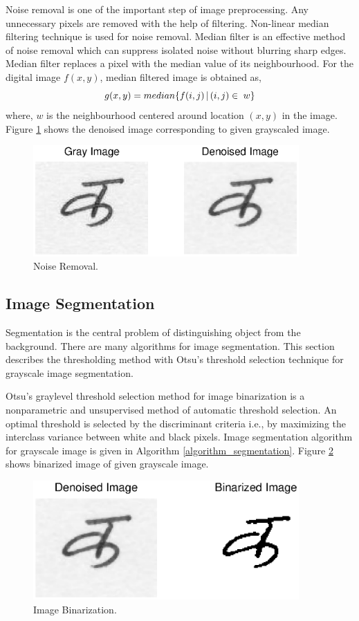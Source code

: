 Noise removal is one of the important step of image preprocessing. Any unnecessary pixels are removed with the help of filtering. Non-linear median filtering technique is used for noise removal. Median filter is an effective method of noise removal which can suppress isolated noise without blurring sharp edges. Median filter replaces a pixel with the median value of its neighbourhood. For the digital image $f(x,y)$, median filtered image is obtained as,
\begin{equation}
g(x,y)= median\{f(i,j)\;\vline \;(i,j)\in \; w \}
\end{equation}
where, $w$ is the neighbourhood centered around location $(x,y)$ in the image.
Figure \ref{figure_denoised} shows the denoised image corresponding to given grayscaled image.
\begin{figure}[hbtp]
\centering
\includegraphics[width=4in]{figures/ka_preprocessing/denoised.eps}
\caption{Noise Removal.}
\label{figure_denoised}
\end{figure}
\subsection{Image Segmentation}\label{section_image_segmentation}

Segmentation is the central problem of distinguishing object from the background. There are many algorithms for image segmentation. This section describes the thresholding method with Otsu's threshold selection technique \cite{Otsu1979} for grayscale image segmentation.

Otsu's graylevel threshold selection method for image binarization is a nonparametric and unsupervised method of automatic threshold selection. An optimal threshold is selected by the discriminant criteria i.e., by maximizing the interclass variance between white and black pixels. Image segmentation algorithm for grayscale image is given in Algorithm \ref{algorithm_segmentation}. Figure \ref{figure_binarized} shows binarized image of given grayscale image.
\begin{figure}[h]
\centering
\includegraphics[width=4in]{figures/ka_preprocessing/binarized.eps}
\caption{Image Binarization.}
\label{figure_binarized}
\end{figure}

